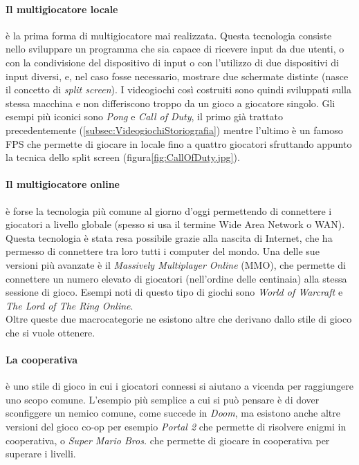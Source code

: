         \paragraph{Il multigiocatore locale} è la prima forma di multigiocatore mai realizzata. Questa tecnologia consiste nello sviluppare un programma che sia
            capace di ricevere input da due utenti, o con la condivisione del dispositivo di input o con l'utilizzo di due dispositivi di input diversi, e, nel caso
            fosse necessario, mostrare due schermate distinte (nasce il concetto di \textit{split screen}). I videogiochi così costruiti sono quindi sviluppati sulla stessa macchina 
            e non differiscono troppo da un gioco a giocatore singolo\cite{glazer2015}. Gli esempi più iconici sono \textit{Pong} e \textit{Call of Duty}, il primo già trattato precedentemente (\ref{subsec:VideogiochiStoriografia})
            mentre l'ultimo è un famoso FPS che permette di giocare in locale fino a quattro giocatori sfruttando appunto la tecnica dello split screen (figura\ref{fig:CallOfDuty.jpg}).

        \paragraph{Il multigiocatore online} è forse la tecnologia più comune al giorno d'oggi permettendo di connettere i giocatori a livello globale (spesso si usa il termine
            Wide Area Network o WAN). Questa tecnologia è stata resa possibile grazie alla nascita di Internet, che ha permesso di connettere tra loro tutti i computer del mondo.
            Una delle sue versioni più avanzate è il \textit{Massively Multiplayer Online} (MMO), che permette di connettere un numero elevato di giocatori (nell'ordine delle centinaia)
            alla stessa sessione di gioco. Esempi noti di questo tipo di giochi sono \textit{World of Warcraft} e \textit{The Lord of The Ring Online}.\\

        Oltre queste due macrocategorie ne esistono altre che derivano dallo stile di gioco che si vuole ottenere.

        \paragraph{La cooperativa} è uno stile di gioco in cui i giocatori connessi si aiutano a vicenda per raggiungere uno scopo comune. L'esempio più semplice a cui si può pensare
            è di dover sconfiggere un nemico comune, come succede in \textit{Doom}, ma esistono anche altre versioni del gioco co-op per esempio \textit{Portal 2} che permette di
            risolvere enigmi in cooperativa, o \textit{Super Mario Bros.} che permette di giocare in cooperativa per superare i livelli.\\
        
